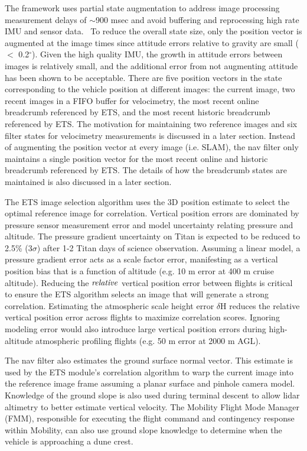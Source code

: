 The framework uses partial state augmentation to address image processing measurement delays of $\sim$900 msec and avoid buffering and reprocessing high rate IMU and sensor data.~\cite{Bayard} To reduce the overall state size, only the position vector is augmented at the image times since attitude errors relative to gravity are small ($<$ 0.2$^{\circ}$).  Given the high quality \ac{IMU}, the growth in attitude errors between images is relatively small, and the additional error from not augmenting attitude has been shown to be acceptable. There are five position vectors in the state corresponding to the vehicle position at different images: the current image, two recent images in a \ac{FIFO} buffer for velocimetry, the most recent online breadcrumb referenced by ETS, and the most recent historic breadcrumb referenced by ETS. The motivation for maintaining two reference images and six filter states for velocimetry measurements is discussed in a later section. Instead of augmenting the position vector at every image (i.e. SLAM), the nav filter only maintains a single position vector for the most recent online and historic breadcrumb referenced by ETS. The details of how the breadcrumb states are maintained is also discussed in a later section. 

The \ac{ETS} image selection algorithm uses the 3D position estimate to select the optimal reference image for correlation.\cite{witte2019no} Vertical position errors are dominated by pressure sensor measurement error and model uncertainty relating pressure and altitude. The pressure gradient uncertainty on Titan is expected to be reduced to 2.5\% ($3\sigma$) after 1-2 Titan days of science observation. Assuming a linear model, a pressure gradient error acts as a scale factor error, manifesting as a vertical position bias that is a function of altitude (e.g. 10 m error at 400 m cruise altitude). Reducing the $\it{relative}$ vertical position error between flights is critical to ensure the \ac{ETS} algorithm selects an image that will generate a strong correlation. Estimating the atmospheric scale height error $\delta$H reduces the relative vertical position error across flights to maximize correlation scores. Ignoring modeling error would also introduce large vertical position errors during high-altitude atmospheric profiling flights (e.g. 50 m error at 2000 m AGL).

The nav filter also estimates the ground surface normal vector.  This estimate is used by the \ac{ETS} module's correlation algorithm to warp the current image into the reference image frame assuming a planar surface and pinhole camera model. Knowledge of the ground slope is also used during terminal descent to allow lidar altimetry to better estimate vertical velocity. The Mobility Flight Mode Manager (FMM), responsible for executing the flight command and contingency response within Mobility, can also use ground slope knowledge to determine when the vehicle is approaching a dune crest.\cite{Lorenz_2021}

